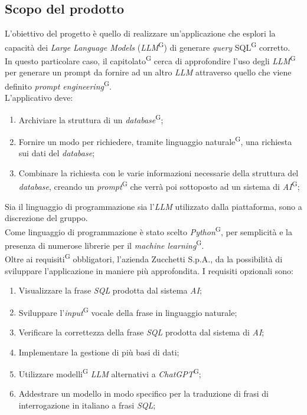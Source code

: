 \documentclass[5pt]{article}
\begin{document}
\subsection{Scopo del prodotto}
L'obiettivo del progetto è quello di realizzare un'applicazione che esplori la capacità dei \textit{Large Language Models} (\textit{LLM}\textsuperscript{G}) di generare \textit{query} SQL\textsuperscript{G} corretto. \\
In questo particolare caso, il capitolato\textsuperscript{G} cerca di approfondire l'uso degli \textit{LLM}\textsuperscript{G} per generare un prompt da fornire ad un altro \textit{LLM} attraverso quello che viene definito \textit{prompt engineering}\textsuperscript{G}.\\
L'applicativo deve:
\begin{enumerate}
    \item Archiviare la struttura di un \textit{database}\textsuperscript{G};
    \item Fornire un modo per richiedere, tramite linguaggio naturale\textsuperscript{G}, una richiesta sui dati del \textit{database};
    \item Combinare la richiesta con le varie informazioni necessarie della struttura del \textit{database}, creando un 
    \textit{prompt}\textsuperscript{G} che verrà poi sottoposto ad un sistema di \textit{AI}\textsuperscript{G};
\end{enumerate}
Sia il linguaggio di programmazione sia l'\textit{LLM} utilizzato dalla piattaforma, sono a discrezione del gruppo. \\
Come linguaggio di programmazione è stato scelto \textit{Python}\textsuperscript{G}, per semplicità e la presenza di numerose librerie per il \textit{machine learning}\textsuperscript{G}.\\

Oltre ai requisiti\textsuperscript{G} obbligatori, l'azienda Zucchetti S.p.A., da la possibilità di sviluppare l'applicazione in maniere più approfondita. I requisiti opzionali sono:
\begin{enumerate}
    \item Visualizzare la frase \textit{SQL} prodotta dal sistema \textit{AI};
    \item Sviluppare l'\textit{input}\textsuperscript{G} vocale della frase in linguaggio naturale;
    \item Verificare la correttezza della frase \textit{SQL} prodotta dal sistema di \textit{AI};
    \item Implementare la gestione di più basi di dati;
    \item Utilizzare modelli\textsuperscript{G} \textit{LLM} alternativi a \textit{ChatGPT}\textsuperscript{G};
    \item Addestrare un modello in modo specifico per la traduzione di frasi di interrogazione in italiano a frasi \textit{SQL};
\end{enumerate}
\end{document}
